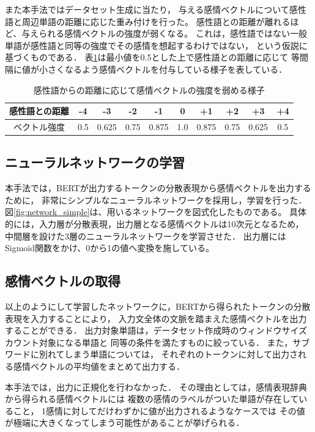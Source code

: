 			また本手法ではデータセット生成に当たり，
			与える感情ベクトルについて感性語と周辺単語の距離に応じた重み付けを行った。
			感性語との距離が離れるほど、与えられる感情ベクトルの強度が弱くなる。
			これは，感性語ではない一般単語が感性語と同等の強度でその感情を想起するわけではない，
			という仮説に基づくものである．
			表\ref{table:vector_weaken}は最小値を0.5とした上で感性語との距離に応じて
			等間隔に値が小さくなるよう感情ベクトルを付与している様子を表している．
			\begin{table}[H]
				\centering
				\caption{感性語からの距離に応じて感情ベクトルの強度を弱める様子}
				\label{table:vector_weaken}
					\begin{tabular}{cccccccccc}
						\hline
						感性語との距離 & -4 & -3 & -2 & -1 & 0 & +1 & +2 & +3 & +4 \\
						\hline
						ベクトル強度 & 0.5 & 0.625 & 0.75 & 0.875 & 1.0 & 0.875 & 0.75 & 0.625 & 0.5 \\
						\hline
					\end{tabular}
			\end{table}

		\subsection{ニューラルネットワークの学習}
			本手法では，BERTが出力するトークンの分散表現から感情ベクトルを出力するために，
			非常にシンプルなニューラルネットワークを採用し，学習を行った．
			図\ref{fig:network_simple}は、用いるネットワークを図式化したものである。
			具体的には，入力層が分散表現，出力層となる感情ベクトルは10次元となるため，
			中間層を設けた3層のニューラルネットワークを学習させた．
			出力層にはSigmoid関数をかけ、0から1の値へ変換を施している。

		\subsection{感情ベクトルの取得}
			以上のようにして学習したネットワークに，BERTから得られたトークンの分散表現を入力することにより，
			入力文全体の文脈を踏まえた感情ベクトルを出力することができる．
			出力対象単語は，データセット作成時のウィンドウサイズカウント対象になる単語と
			同等の条件を満たすものに絞っている．
			また，サブワードに別れてしまう単語については，
			それぞれのトークンに対して出力される感情ベクトルの平均値をまとめて出力する．

			本手法では，出力に正規化を行わなかった．
			その理由としては，感情表現辞典から得られる感情ベクトルには
			複数の感情のラベルがついた単語が存在していること，
			1感情に対してだけわずかに値が出力されるようなケースでは
			その値が極端に大きくなってしまう可能性があることが挙げられる．
